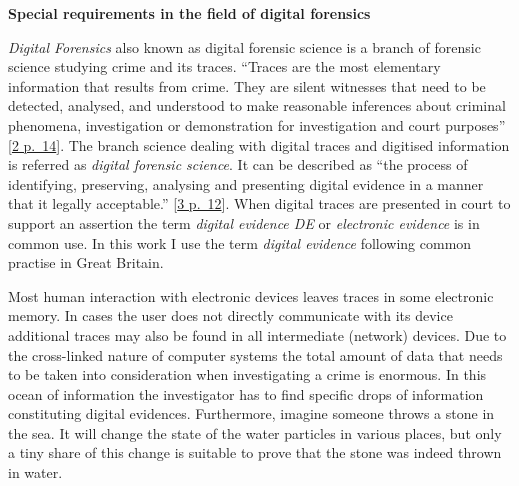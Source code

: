 
\begin{abstract}
Within the framework of this study the suitability of the \emph{Rust}
ecosystem for forensic tool development was evaluated. As case study,
the tool \emph{Strings­ext} was developed. Starting from analysing the
specific requirements of forensic software in general and those of the
present case study, all stages of the software development life-cycle
have been executed, up to the first production release.
\emph{Strings­ext} is a reimplementation and enhancement of the
\emph{GNU-strings} tool, a widely used program in forensic
investigations. \emph{Strings­ext} recognizes Cyrillic, CJKV characters
and other scripts in all supported multi-byte-encodings while
\emph{GNU-strings} fails in finding these in UTF-16 and other encodings.

During the case study it has become apparent that the \emph{Rust}
ecosystem provides good support for secure coding principles and unit
testing. Furthermore, the benchmarks showed a satisfactory performance
of the resulting \emph{Strings­ext} binaries comparable to the original
\emph{C} version.
\end{abstract}


\textbf{Special requirements in the field of digital
forensics}

\emph{Digital Forensics} also known as digital forensic science is a
branch of forensic science studying crime and its traces. ``Traces are
the most elementary information that results from crime. They are silent
witnesses that need to be detected, analysed, and understood to make
reasonable inferences about criminal phenomena, investigation or
demonstration for investigation and court purposes''
{[}\protect\hyperlink{meuwly2016}{2 p.~14}{]}. The branch science
dealing with digital traces and digitised information is referred as
\emph{digital forensic science}. It can be described as ``the process of
identifying, preserving, analysing and presenting digital evidence in a
manner that it legally acceptable.'' {[}\protect\hyperlink{guo2009}{3
p.~12}{]}. When digital traces are presented in court to support an
assertion the term \emph{digital evidence DE} or \emph{electronic
evidence} is in common use. In this work I use the term \emph{digital
evidence} following common practise in Great Britain.

Most human interaction with electronic devices leaves traces in some
electronic memory. In cases the user does not directly communicate with
its device additional traces may also be found in all intermediate
(network) devices. Due to the cross-linked nature of computer systems
the total amount of data that needs to be taken into consideration when
investigating a crime is enormous. In this ocean of information the
investigator has to find specific drops of information constituting
digital evidences. Furthermore, imagine someone throws a stone in the
sea. It will change the state of the water particles in various places,
but only a tiny share of this change is suitable to prove that the stone
was indeed thrown in water.


